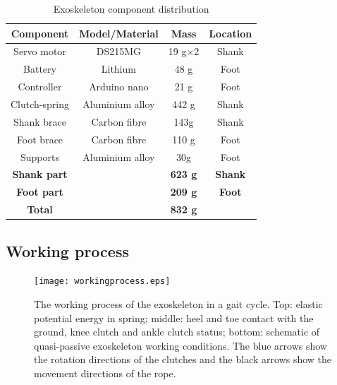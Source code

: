 \documentclass[twocolumn,cleanfoot,10pt]{asme2ej}
\begin{document}
\begin{table}[t]
	\caption{Exoskeleton component distribution}
	\begin{center}
		\label{tab:hardware}
		\begin{tabular}{c c c c}	
			\hline
			\textbf{Component} & \textbf{Model/Material} & \textbf{Mass} & \textbf{Location} \\
			\hline
			Servo motor & DS215MG & 19 g$\times$2 & Shank\\
			Battery & Lithium & 48 g & Foot\\
			Controller & Arduino nano & 21 g & Foot\\
			Clutch-spring & Aluminium alloy & 442 g & Shank\\
			Shank brace & Carbon fibre & 143g & Shank\\
			Foot brace & Carbon fibre & 110 g & Foot\\
			Supports & Aluminium alloy & 30g & Foot\\			
			\hline 
			\textbf{Shank part} & & \textbf{623 g} & \textbf{Shank}\\
			\textbf{Foot part} & & \textbf{209 g} & \textbf{Foot}\\
			\hline
			\textbf{Total} & & \textbf{832 g} & \\
			\hline
		\end{tabular}
	\end{center}
\end{table}



\subsection{Working process}
\label{subsec:Working process}

\begin{figure}[tb]
	\centering
	\texttt{[image: workingprocess.eps]}
	\caption{The working process of the exoskeleton in a gait cycle.
	Top: elastic potential energy in spring; middle: heel and toe contact with the ground, knee clutch and ankle clutch status; bottom: schematic of quasi-passive exoskeleton working conditions.
	The blue arrows show the rotation directions of the clutches and the black arrows show the movement directions of the rope.}
	\label{fig:workprocess}   
\end{figure}
\end{document}
